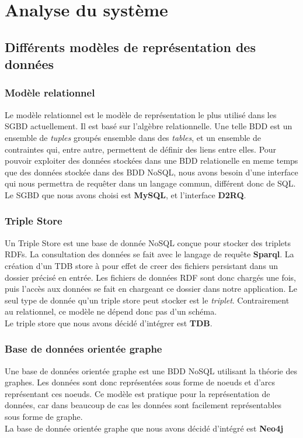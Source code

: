 \documentclass{article}
\begin{document}
\section{Analyse du système}

\subsection{Différents modèles de représentation des données}

\subsubsection{Modèle relationnel}
Le modèle relationnel est le modèle de représentation le plus utilisé dans les SGBD actuellement. Il est basé sur l'algèbre relationnelle. Une telle BDD est un ensemble de \textit{tuples} groupés ensemble dans des \textit{tables}, et un ensemble de contraintes qui, entre autre, permettent de définir des liens entre elles.
Pour pouvoir exploiter des données stockées dans une BDD relationelle en meme temps que des données stockée dans des BDD NoSQL, nous avons besoin d'une interface qui nous permettra de requêter dans un langage commun, différent donc de SQL.\\
Le SGBD que nous avons choisi est \textbf{MySQL}, et l'interface \textbf{D2RQ}.
\subsubsection{Triple Store}
Un Triple Store est une base de donnée NoSQL conçue pour stocker des triplets RDFs. La consultation des données se fait avec le langage de requête \textbf{Sparql}. 
La création d'un TDB store à pour effet de creer des fichiers persistant dans un dossier précisé en entrée. Les fichiers de données RDF sont donc chargés une fois, puis l'accès aux données se fait en chargeant ce dossier dans notre application. Le seul type de donnée qu'un triple store peut stocker est le \textit{triplet}. Contrairement au relationnel, ce modèle ne dépend donc pas d'un schéma.\\
Le triple store que nous avons décidé d'intégrer est \textbf{TDB}.
\subsubsection{Base de données orientée graphe}
Une base de données orientée graphe est une BDD NoSQL utilisant la théorie des graphes. Les données sont donc représentées sous forme de noeuds et d'arcs représentant ces noeuds. Ce modèle est pratique pour la représentation de données, car dans beaucoup de cas les données sont facilement représentables sous forme de graphe.\\
La base de donnée orientée graphe que nous avons décidé d'intégré est \textbf{Neo4j}
\end{document}
